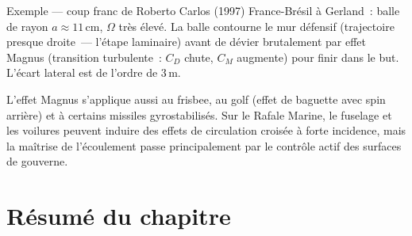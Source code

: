 \documentclass[11pt,a4paper]{report}
\begin{document}
\begin{importantbox}{Exemple --- coup franc de Roberto Carlos (1997)}
France-Br\'esil \`a Gerland~: balle de rayon $a \approx 11\,\mathrm{cm}$, $\Omega$ tr\`es \'elev\'e.
La balle contourne le mur d\'efensif (trajectoire presque droite~--- l'\'etape laminaire)
avant de d\'evier brutalement par effet Magnus (transition turbulente~: $C_D$ chute,
$C_M$ augmente) pour finir dans le but. L'\'ecart lateral est de l'ordre de $3\,\mathrm{m}$.
\end{importantbox}

L'effet Magnus s'applique aussi au frisbee, au golf (effet de baguette avec spin arri\`ere) et
\`a certains missiles gyrostabilis\'es. Sur le Rafale Marine, le fuselage et les voilures
peuvent induire des effets de circulation crois\'ee \`a forte incidence, mais la ma\^itrise
de l'\'ecoulement passe principalement par le contr\^ole actif des surfaces de gouverne.

\section*{Résumé du chapitre}
\end{document}
